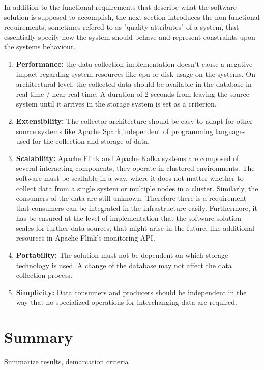 In addition to the functional-requirements that describe what the software solution is supposed
to accomplish, the next section introduces the non-functional requirements, sometimes refered to as
"quality attributes" of a system, that essentially specify how the system should behave and represent
constraints upon the systems behaviour.

\begin{enumerate}
    \item \textbf{Performance:} the data collection implementation doesn't cause a negative impact regarding
    system resources like cpu or disk usage on the systems. On architectural level, the collected data should be
    available in the database in real-time / near real-time. A duration of 2 seconds from leaving the source system until
    it arrives in the storage system is set as a criterion.

    \item \textbf{Extensibility:} The collector architecture should be easy to adapt for other source systems
    like Apache Spark,independent of programming languages used for the collection and storage of data.

    \item \textbf{Scalability:} Apache Flink and Apache Kafka systems are composed of several interacting components, they
    operate in clustered environments. The software must be scallable in a way, where it does not matter whether to collect
    data from a single system or multiple nodes in a cluster. Similarly, the consumers of the data are still unknown. Therefore
    there is a requirement that consumers can be integrated in the infrastructure easily.
    Furthermore, it has be ensured at the level of implementation that the software solution scales for further data sources,
    that might arise in the future, like additional resources in Apache Flink's monitoring API.

    \item \textbf{Portability:} The solution must not be dependent on which storage technology is used. A change of the
    database may not affect the data collection process.

    \item \textbf{Simplicity:} Data consumers and producers should be independent in the way that no specialized operations
    for interchanging data are required.

\end{enumerate}

\section{Summary}

Summarize results, demarcation criteria